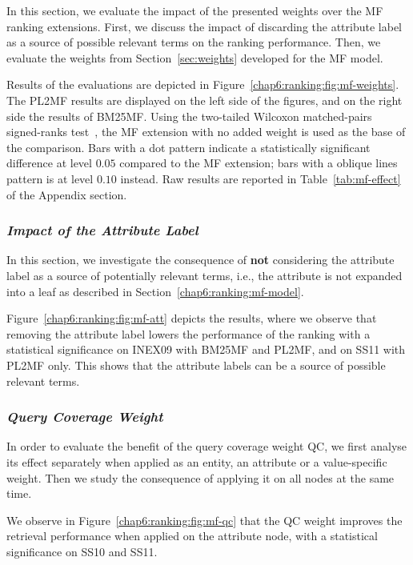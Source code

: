 In this section, we evaluate the impact of the presented weights over the \gls{MF} ranking extensions. First, we discuss the impact of discarding the attribute label as a source of possible relevant terms on the ranking performance. Then, we evaluate the weights from Section~\ref{sec:weights} developed for the \gls{MF} model.

Results of the evaluations are depicted in Figure~\ref{chap6:ranking:fig:mf-weights}. The \gls{PL2MF} results are displayed on the left side of the figures, and on the right side the results of \gls{BM25MF}. Using the two-tailed Wilcoxon matched-pairs signed-ranks test~\cite{sheskin:2003:CRC,buttcher:2010:IRI:1869919}, the \gls{MF} extension with no added weight is used as the base of the comparison. Bars with a dot pattern indicate a statistically significant difference at level $0.05$ compared to the \gls{MF} extension; bars with a oblique lines pattern is at level $0.10$ instead. Raw results are reported in Table~\ref{tab:mf-effect} of the Appendix section.

\subsubsection{\emph{Impact of the Attribute Label}}
\label{sec:with-att}

In this section, we investigate the consequence of \textbf{not} considering the attribute label as a source of potentially relevant terms, i.e., the attribute is not expanded into a leaf as described in Section~\ref{chap6:ranking:mf-model}.

Figure~\ref{chap6:ranking:fig:mf-att} depicts the results, where we observe that removing the attribute label lowers the performance of the ranking with a statistical significance on INEX09 with \gls{BM25MF} and \gls{PL2MF}, and on SS11 with \gls{PL2MF} only. This shows that the attribute labels can be a source of possible relevant terms.

\subsubsection{\emph{Query Coverage Weight}}
\label{sec:qc-weight-effect}

In order to evaluate the benefit of the query coverage weight QC, we first analyse its effect separately when applied as an entity, an attribute or a value-specific weight. Then we study the consequence of applying it on all nodes at the same time.

We observe in Figure~\ref{chap6:ranking:fig:mf-qc} that the QC weight improves the retrieval performance when applied on the attribute node, with a statistical significance on SS10 and SS11.

